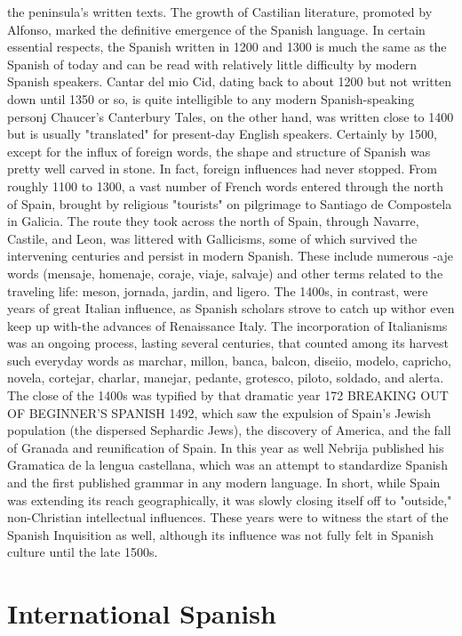 \documentclass[14pt,a4paper,oneside]{memoir}
\begin{document}
{{{{the peninsula's written texts. The growth of Castilian literature, promoted by Alfonso, marked the definitive emergence of the Spanish
language.
In certain essential respects, the Spanish written in 1200 and
1300 is much the same as the Spanish of today and can be read with
relatively little difficulty by modern Spanish speakers. Cantar del mio
Cid, dating back to about 1200 but not written down until 1350 or so,
is quite intelligible to any modern Spanish-speaking personj Chaucer's
Canterbury Tales, on the other hand, was written close to 1400 but
is usually "translated" for present-day English speakers. Certainly by
1500, except for the influx of foreign words, the shape and structure of
Spanish was pretty well carved in stone.
In fact, foreign influences had never stopped. From roughly
1100 to 1300, a vast number of French words entered through the
north of Spain, brought by religious "tourists" on pilgrimage to Santiago de Compostela in Galicia. The route they took across the north
of Spain, through Navarre, Castile, and Leon, was littered with Gallicisms, some of which survived the intervening centuries and persist in
modern Spanish. These include numerous -aje words (mensaje, homenaje, coraje, viaje, salvaje) and other terms related to the traveling life:
meson, jornada, jardin, and ligero. The 1400s, in contrast, were years
of great Italian influence, as Spanish scholars strove to catch up withor even keep up with-the advances of Renaissance Italy. The incorporation of Italianisms was an ongoing process, lasting several centuries,
that counted among its harvest such everyday words as marchar, millon, banca, balcon, diseiio, modelo, capricho, novela, cortejar, charlar,
manejar, pedante, grotesco, piloto, soldado, and alerta.
The close of the 1400s was typified by that dramatic year
172 BREAKING OUT OF BEGINNER'S SPANISH
1492, which saw the expulsion of Spain's Jewish population (the dispersed Sephardic Jews), the discovery of America, and the fall of Granada and reunification of Spain. In this year as well Nebrija published
his Gramatica de la lengua castellana, which was an attempt to standardize Spanish and the first published grammar in any modern language. In short, while Spain was extending its reach geographically, it
was slowly closing itself off to "outside," non-Christian intellectual influences. These years were to witness the start of the Spanish Inquisition as well, although its influence was not fully felt in Spanish culture until the late 1500s.

\section{International Spanish}

}}}}
\end{document}
